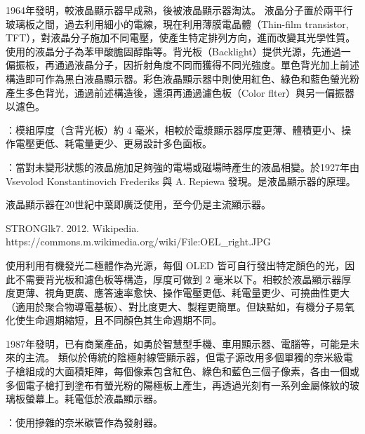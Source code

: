\documentclass[a4paper,12pt]{report}
\begin{document}
\begin{itemize}
1964年發明，較液晶顯示器早成熟，後被液晶顯示器淘汰。
\bct\bfH\ctr{}\ef\FB\ect
液晶分子置於兩平行玻璃板之間，過去利用細小的電線，現在利用薄膜電晶體（Thin-film transistor, TFT），對液晶分子施加不同電壓，使產生特定排列方向，進而改變其光學性質。使用的液晶分子為苯甲酸膽固醇酯等。背光板（Backlight）提供光源，先通過一偏振板，再通過液晶分子，因折射角度不同而獲得不同光強度。單色背光加上前述構造即可作為黑白液晶顯示器。彩色液晶顯示器中則使用紅色、綠色和藍色螢光粉產生多色背光，通過前述構造後，還須再通過濾色板（Color flter）與另一偏振器以濾色。

：模組厚度（含背光板）約 4 毫米，相較於電漿顯示器厚度更薄、體積更小、操作電壓更低、耗電量更少、更易設計多色面板。

：當對未變形狀態的液晶施加足夠強的電場或磁場時產生的液晶相變。於1927年由 Vsevolod Konstantinovich Frederiks 與 A. Repiewa 發現。是液晶顯示器的原理。

液晶顯示器在20世紀中葉即廣泛使用，至今仍是主流顯示器。
\bct\bfH\ctr{}\caption{STRONGlk7. 2012. Wikipedia. https://commons.m.wikimedia.org/wiki/File:OEL\_right.JPG}\ef\FB\ect
使用利用有機發光二極體作為光源，每個 OLED 皆可自行發出特定顏色的光，因此不需要背光板和濾色板等構造，厚度可做到 2 毫米以下。相較於液晶顯示器厚度更薄、視角更廣、應答速率愈快、操作電壓更低、耗電量更少、可撓曲性更大（適用於聚合物導電基板）、對比度更大、製程更簡單。但缺點如，有機分子易氧化使生命週期縮短，且不同顏色其生命週期不同。

1987年發明，已有商業產品，如勇於智慧型手機、車用顯示器、電腦等，可能是未來的主流。
類似於傳統的陰極射線管顯示器，但電子源改用多個單獨的奈米級電子槍組成的大面積矩陣，每個像素包含紅色、綠色和藍色三個子像素，各由一個或多個電子槍打到塗布有螢光粉的陽極板上產生，再透過光刻有一系列金屬條紋的玻璃板螢幕上。耗電低於液晶顯示器。

：使用摻雜的奈米碳管作為發射器。


\end{itemize}
\end{document}
